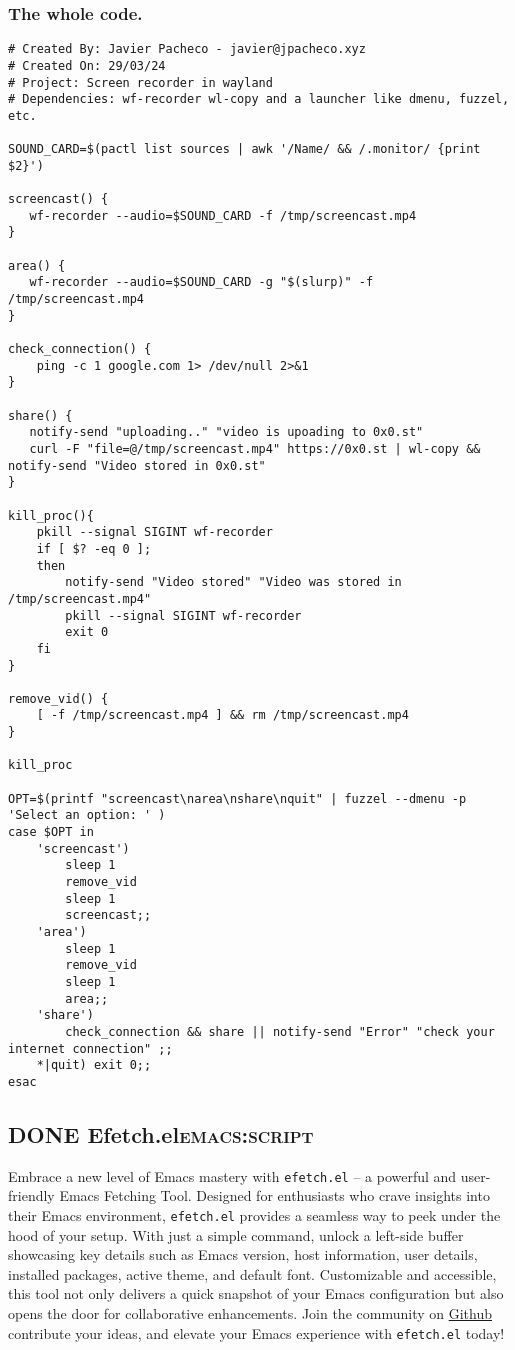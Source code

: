 \documentclass[11pt]{article}
\begin{document}
\subsubsection{The whole code.}
\label{sec:orgbc797a0}
\begin{verbatim}
# Created By: Javier Pacheco - javier@jpacheco.xyz
# Created On: 29/03/24
# Project: Screen recorder in wayland
# Dependencies: wf-recorder wl-copy and a launcher like dmenu, fuzzel, etc.

SOUND_CARD=$(pactl list sources | awk '/Name/ && /.monitor/ {print $2}')

screencast() {
   wf-recorder --audio=$SOUND_CARD -f /tmp/screencast.mp4
}

area() {
   wf-recorder --audio=$SOUND_CARD -g "$(slurp)" -f /tmp/screencast.mp4
}

check_connection() {
    ping -c 1 google.com 1> /dev/null 2>&1
}

share() {
   notify-send "uploading.." "video is upoading to 0x0.st"
   curl -F "file=@/tmp/screencast.mp4" https://0x0.st | wl-copy && notify-send "Video stored in 0x0.st"
}

kill_proc(){
    pkill --signal SIGINT wf-recorder
    if [ $? -eq 0 ];
    then
        notify-send "Video stored" "Video was stored in /tmp/screencast.mp4"
        pkill --signal SIGINT wf-recorder
        exit 0
    fi
}

remove_vid() {
    [ -f /tmp/screencast.mp4 ] && rm /tmp/screencast.mp4
}

kill_proc

OPT=$(printf "screencast\narea\nshare\nquit" | fuzzel --dmenu -p 'Select an option: ' )
case $OPT in
    'screencast')
        sleep 1
        remove_vid
        sleep 1
        screencast;;
    'area')
        sleep 1
        remove_vid
        sleep 1
        area;;
    'share') 
        check_connection && share || notify-send "Error" "check your internet connection" ;;
    *|quit) exit 0;;
esac
\end{verbatim}
\subsection{{\bfseries\sffamily DONE} Efetch.el\hfill{}\textsc{emacs:script}}
\label{sec:org45010c7}
\begin{PREVIEW}
Embrace a new level of Emacs mastery with \texttt{efetch.el} – a powerful and user-friendly Emacs Fetching Tool. Designed for enthusiasts who crave insights into their Emacs environment, \texttt{efetch.el} provides a seamless way to peek under the hood of your setup. With just a simple command, unlock a left-side buffer showcasing key details such as Emacs version, host information, user details, installed packages, active theme, and default font. Customizable and accessible, this tool not only delivers a quick snapshot of your Emacs configuration but also opens the door for collaborative enhancements. Join the community on \href{https://github.com/jpachecoxyz/efetch.el}{Github} contribute your ideas, and elevate your Emacs experience with \texttt{efetch.el} today!
\end{PREVIEW}
\end{document}
